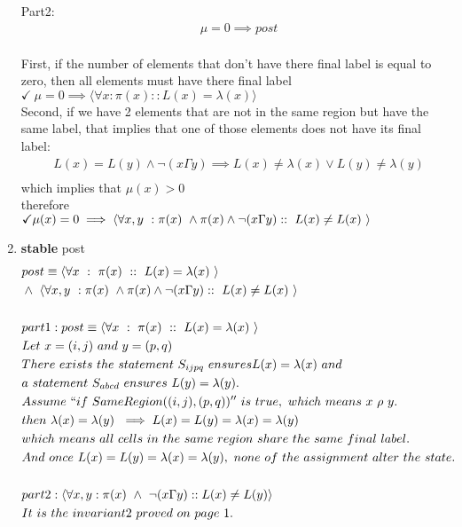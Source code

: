 \documentclass{article}
\begin{document}
\begin{enumerate}
Part2:\\
\begin{align*}
&\mu = 0 \implies post\\
\end{align*}

First, if the number of elements that don't have there final label is equal to zero, then all elements must have there final label\\
$\checkmark \ \mu = 0 \implies \langle \forall x : \pi(x) :: L(x)=\lambda(x) \rangle$\\

Second, if we have 2 elements that are not in the same region but have the same label, that implies that one of those elements does not have its final label:\\
\begin{align*}
&L(x) = L(y) \wedge \neg(x \Gamma y) \implies L(x)\neq\lambda(x) \vee L(y)\neq \lambda(y)\\
\end{align*}
which implies that
$\mu(x) > 0$\\
therefore\\
$\checkmark \mu(x)=0 \implies  \langle \forall x,y \ : \pi(x) \ \wedge \pi(x) \wedge \neg(x \Gamma y) :: \ L(x) \neq L(x)  \ \rangle\\$


\newpage
\item
\textbf{stable} post\\
\begin{align*}
&post \equiv \langle \forall x \ : \ \pi(x) \ :: \ L(x) = \lambda(x) \ \rangle\\
&\wedge \ \langle \forall x,y \ : \pi(x) \ \wedge \pi(x) \wedge \neg(x \Gamma y) :: \ L(x) \neq L(x)  \ \rangle\\
\\
&part 1:
post \equiv \langle \forall x \ : \ \pi(x) \ :: \ L(x) = \lambda(x) \ \rangle\\
&Let\ x = (i,j) \ and \ y = (p,q)\\
&There \ exists \ the \ statement\ S_{ijpq} \ ensures L(x)=\lambda(x) \ and\\ 
&a\ statement \ S_{abcd}\ ensures \ L(y)=\lambda(y).\\
&Assume\ ``if\ SameRegion((i,j),(p,q))'' \ is\ true,\ which\ means\ x\ \rho\ y.\\ 
&then \ \lambda(x)=\lambda(y)\ \implies L(x)=L(y)=\lambda(x)=\lambda(y)\\
&which\ means\ all\ cells\ in \ the\ same\ region\ share\ the\ same\ final\ label.\\
&And \ once \ L(x)=L(y)=\lambda(x)=\lambda(y), \ none\ of\ the\ assignment\ alter\ the \ state.\\
\\
&part 2:
\langle \forall x,y : \pi(x) \ \wedge \ \neg(x\Gamma y) :: L(x)\neq L(y) \rangle\\
&It\ is\ the\ invariant2\ proved\ on\ page\ 1.
\end{align*}
\end{enumerate}
\end{document}
